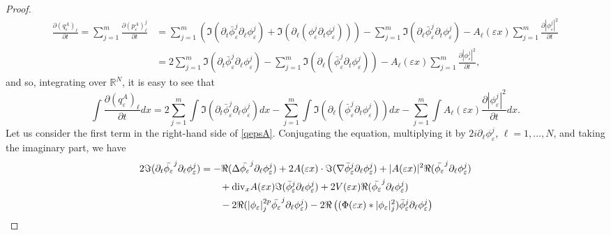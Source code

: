 \documentclass[11pt]{amsart}
\numberwithin{equation}{section}
\theoremstyle{definition}
\begin{document}
\begin{proof}
$$\begin{aligned}
\frac{\partial (q_{\varepsilon}^A)_\ell}{\partial t} =\sum_{j=1}^m
\frac{\partial (p_{\varepsilon}^A)_\ell^j}{\partial t}
&=\sum_{j=1}^m\left({{\Im}}(\partial_t\bar{\phi}_{\varepsilon}^j\partial_\ell\phi_{\varepsilon}^j)
+{{\Im}}(\partial_\ell(\phi_{\varepsilon}^j\partial_t\phi_{\varepsilon}^j))\right)
-\sum_{j=1}^m{{\Im}}(\partial_\ell\bar{\phi}_{\varepsilon}^j\partial_t\phi_{\varepsilon}^j)
-A_\ell({\varepsilon} x)\sum_{j=1}^m\frac{\partial
|\phi_{\varepsilon}^j|^2}{\partial
t}\\
& =
2\sum_{j=1}^m{{\Im}}(\partial_t\bar{\phi}_{\varepsilon}^j\partial_\ell\phi_{\varepsilon}^j)
-\sum_{j=1}^m{{\Im}}\left(\partial_\ell(\bar{\phi}_{\varepsilon}^j\partial_t\phi_{\varepsilon}^j)\right)
-A_\ell({\varepsilon} x)\sum_{j=1}^m\frac{\partial
|\phi_{\varepsilon}^j|^2}{\partial t},
\end{aligned}$$
and so, integrating over ${{\mathbb R}}^N$, it is easy to see that
\begin{equation}
    \label{qepsA}
\int \frac{\partial (q_{\varepsilon}^A)_\ell}{\partial t} dx
=2\sum_{j=1}^m\int
{{\Im}}(\partial_t\bar{\phi}_{\varepsilon}^j\partial_\ell\phi_{\varepsilon}^j)dx-\sum_{j=1}^m\int
{{\Im}}\left(\partial_\ell(\bar{\phi}_{\varepsilon}^j\partial_t\phi_{\varepsilon}^j)\right)dx
  -\sum_{j=1}^m\int A_\ell({\varepsilon} x)\frac{\partial
|\phi_{\varepsilon}^j|^2}{\partial t}dx.
\end{equation}
Let us consider the first term in the right-hand side of
\eqref{qepsA}. Conjugating the equation, multiplying it by
$2i\partial_\ell\phi_{\varepsilon}^j$, $\ell=1, \dots, N$, and taking the
imaginary part, we have
$$\begin{aligned} 2
{{\Im}}(\partial_{t}\bar{\phi_{\varepsilon}}^j\partial_\ell\phi_{\varepsilon}^j)
&=-{{\Re}}(\Delta \bar{\phi_{\varepsilon}}^j\partial_\ell\phi_{\varepsilon}^j)
+2A({\varepsilon} x)\cdot{{\Im}}(\nabla
\bar\phi_{\varepsilon}^j\partial_\ell\phi_{\varepsilon}^j)
+|A({\varepsilon} x)|^2{{\Re}}(\bar{\phi_{\varepsilon}}^j\partial_\ell\phi_{\varepsilon}^j)  \\
& \qquad +{\rm div}_xA({\varepsilon}
x){{\Im}}(\bar\phi_{\varepsilon}^j\partial_\ell\phi_{\varepsilon}^j)+
2V({\varepsilon} x){{\Re}}(\bar{\phi_{\varepsilon}}^j\partial_\ell\phi_{\varepsilon}^j)\\
& \qquad
-2{{\Re}}(|\phi_{\varepsilon}|^{2p}_j\bar{\phi_{\varepsilon}}^j\partial_\ell\phi_{\varepsilon}^j)
- 2{{\Re}}\left((\Phi({\varepsilon} x)*|\phi_{\varepsilon}|_j^2)\bar \phi_{\varepsilon}^j\partial_\ell\phi_{\varepsilon}^j\right)\\

\end{aligned}$$
\end{proof}
\end{document}
